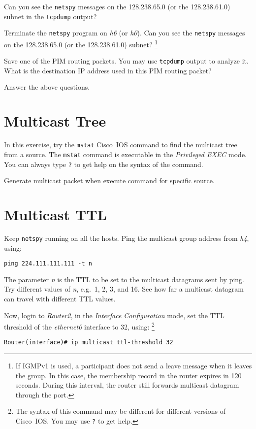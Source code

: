 \documentclass{../UTNetLab}
\begin{document}
    Can you see the \lstinline{netspy} messages on the 128.238.65.0 (or the 128.238.61.0) subnet in the \lstinline{tcpdump} output? 

    Terminate the \lstinline{netspy} program on \textit{h6} (or \textit{h0}).
    Can you see the \lstinline{netspy} messages on the 128.238.65.0 (or the 128.238.61.0) subnet?
    \footnote{If IGMPv1 is used, a participant does not send a leave message when it leaves the group.
    In this case, the membership record in the router expires in 120 seconds.
    During this interval, the router still forwards multicast datagram through the port.} 

    Save one of the PIM routing packets.
    You may use \lstinline{tcpdump} output to analyze it.
    What is the destination IP address used in this PIM routing packet?
    
    \begin{report}
    \item Answer the above questions.
    \end{report}

\section{Multicast Tree}
    In this exercise, try the \lstinline[language={cisco}]{mstat} Cisco~IOS command to find the multicast tree from a source.
    The \lstinline[language={cisco}]{mstat} command is executable in the \textit{Privileged EXEC} mode.
    You can always type \lstinline[language={cisco}]{?} to get help on the syntax of the command.

    Generate multicast packet when execute command for specific source.

\section{Multicast TTL}
    Keep \lstinline{netspy} running on all the hosts.
    Ping the multicast group address from \textit{h4}, using: 
    \begin{lstlisting}[emph={n}]
ping 224.111.111.111 -t n
    \end{lstlisting}

    The parameter \textit{n} is the TTL to be set to the multicast datagrams sent by ping.
    Try different values of \textit{n}, e.g.\ 1, 2, 3, and 16.
    See how far a multicast datagram can travel with different TTL values. 

    Now, login to \textit{Router2}, in the \textit{Interface Configuration} mode, set the TTL threshold of the \textit{ethernet0} interface to 32, using: 
    \footnote{The syntax of this command may be different for different versions of Cisco~IOS. You may use \lstinline[language={cisco}]{?} to get help.}
    \begin{lstlisting}[language={cisco}]    
Router(interface)# ip multicast ttl-threshold 32
    \end{lstlisting}
\end{document}
